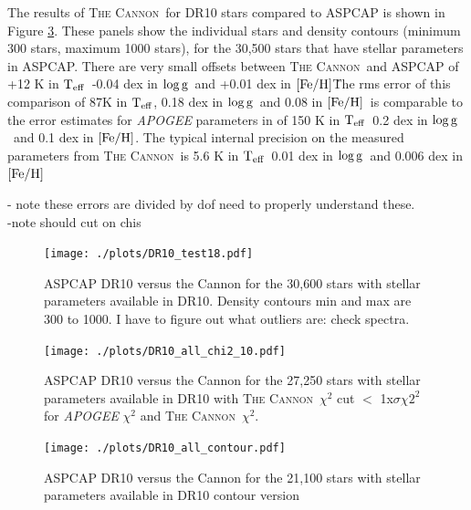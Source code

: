 \documentclass[12pt, preprint]{aastex}
\newcommand{\teff}{\mbox{$\rm T_{eff}$}}
\newcommand{\feh}{\mbox{$\rm [Fe/H]$}}
\newcommand{\logg}{\mbox{$\rm \log g$}}
\newcommand{\tc}{\textsc{The Cannon}}
\begin{document}
The results of \tc\ for DR10 stars compared to ASPCAP is shown in Figure \ref{fig:DR10_compare}. These panels show the individual stars and density contours  (minimum 300 stars, maximum 1000 stars), for the 30,500 stars that have stellar parameters in ASPCAP. There are very small offsets between \tc\ and ASPCAP of +12 K in \teff\, -0.04 dex in \logg\ and +0.01 dex in \feh\. The rms error of this comparison of 87K in \teff, 0.18 dex in \logg\ and 0.08 in \feh\ is comparable to the error estimates for \textit{APOGEE} parameters in \citet{Meszaros2013} of 150 K in \teff\, 0.2 dex in \logg\ and 0.1 dex in \feh.  The typical internal precision on the measured parameters from \tc\ is 5.6 K in \teff\, 0.01 dex in \logg\ and 0.006 dex in \feh\ 

- note these errors are divided by dof need to properly understand these. \\

-note should cut on chis


\begin{figure}[h!]
\centering
        \texttt{[image: ./plots/DR10\_test18.pdf]} \\
\caption{\small{ASPCAP DR10 versus the Cannon for the 30,600 stars with stellar parameters available in DR10. Density contours min and max are 300 to 1000. I have to figure out what outliers are: check spectra.}}
\label{fig:DR10_compare}
\end{figure}


\begin{figure}[h!]
\centering
        \texttt{[image: ./plots/DR10\_all\_chi2\_10.pdf]} \\
\caption{\small{ASPCAP DR10 versus the Cannon for the 27,250 stars with stellar parameters available in DR10 with \tc\ $\chi^2$ cut $<$ 1x$\sigma \chi2^2$ for \textit{APOGEE} $\chi^2$ and \tc\ $\chi^2$.}}
\label{fig:DR10_compare}
\end{figure}


\begin{figure}[h!]
\centering
        \texttt{[image: ./plots/DR10\_all\_contour.pdf]} \\
\caption{\small{ASPCAP DR10 versus the Cannon for the 21,100 stars with stellar parameters available in DR10 contour version}}
\label{fig:DR10_compare}
\end{figure}
\end{document}

